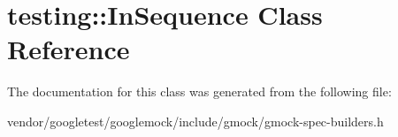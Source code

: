 \hypertarget{classtesting_1_1InSequence}{}\section{testing\+:\+:In\+Sequence Class Reference}
\label{classtesting_1_1InSequence}


The documentation for this class was generated from the following file\+:\begin{DoxyCompactItemize}
\item 
vendor/googletest/googlemock/include/gmock/gmock-\/spec-\/builders.\+h\end{DoxyCompactItemize}
